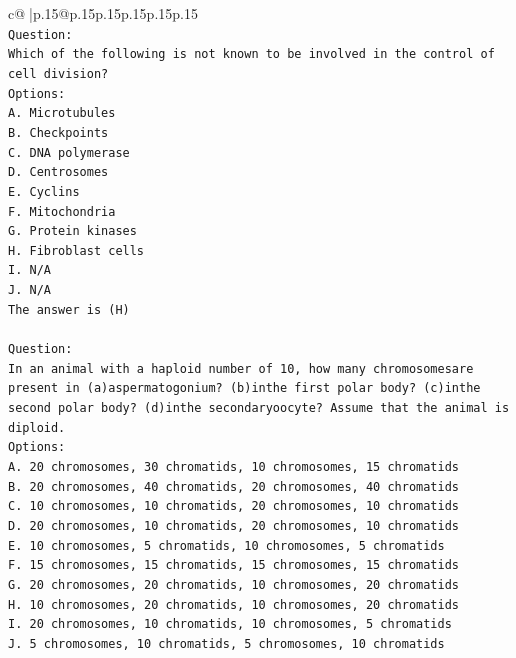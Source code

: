 \documentclass{article}
\begin{document}
{\begin{supertabular}{c@{$\;$}|p{.15\linewidth}@{}p{.15\linewidth}p{.15\linewidth}p{.15\linewidth}p{.15\linewidth}p{.15\linewidth}}
{{{\\ 
\texttt{Question:} \\
\texttt{Which of the following is not known to be involved in the control of cell division?} \\
\texttt{Options:} \\
\texttt{A. Microtubules} \\
\texttt{B. Checkpoints} \\
\texttt{C. DNA polymerase} \\
\texttt{D. Centrosomes} \\
\texttt{E. Cyclins} \\
\texttt{F. Mitochondria} \\
\texttt{G. Protein kinases} \\
\texttt{H. Fibroblast cells} \\
\texttt{I. N/A} \\
\texttt{J. N/A} \\
\texttt{The answer is (H)} \\
\\ 
\texttt{Question:} \\
\texttt{In an animal with a haploid number of 10, how many chromosomesare present in (a)aspermatogonium? (b)inthe first polar body? (c)inthe second polar body? (d)inthe secondaryoocyte? Assume that the animal is diploid.} \\
\texttt{Options:} \\
\texttt{A. 20 chromosomes, 30 chromatids, 10 chromosomes, 15 chromatids} \\
\texttt{B. 20 chromosomes, 40 chromatids, 20 chromosomes, 40 chromatids} \\
\texttt{C. 10 chromosomes, 10 chromatids, 20 chromosomes, 10 chromatids} \\
\texttt{D. 20 chromosomes, 10 chromatids, 20 chromosomes, 10 chromatids} \\
\texttt{E. 10 chromosomes, 5 chromatids, 10 chromosomes, 5 chromatids} \\
\texttt{F. 15 chromosomes, 15 chromatids, 15 chromosomes, 15 chromatids} \\
\texttt{G. 20 chromosomes, 20 chromatids, 10 chromosomes, 20 chromatids} \\
\texttt{H. 10 chromosomes, 20 chromatids, 10 chromosomes, 20 chromatids} \\
\texttt{I. 20 chromosomes, 10 chromatids, 10 chromosomes, 5 chromatids} \\
\texttt{J. 5 chromosomes, 10 chromatids, 5 chromosomes, 10 chromatids} \\
            }
        }
    }
     \\ \\


\end{supertabular}}
\end{document}
